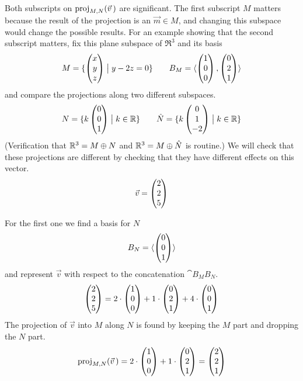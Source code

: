 \begin{example}  \label{ex:ProjIntoMAlongNGener}
Both subscripts on $\proj{\vec{v}\,}{M,N}$ are significant.
The first subscript $M$ matters because the result of
the projection is an $\vec{m}\in M$, and changing this subspace would
change the possible results.
For an example showing that the second subscript matters,  
fix this plane subspace of $\Re^3$ and its basis 
\begin{equation*}
  M=\set{\colvec{x \\ y \\ z}\suchthat y-2z=0}
  \qquad
  B_M=\sequence{
                \colvec{1 \\ 0 \\ 0},
                \colvec{0 \\ 2 \\ 1} }
\end{equation*}
and compare the projections along two different subspaces. 
\begin{equation*}
  N=\set{k\colvec{0 \\ 0 \\ 1}\suchthat k\in\Re}
  \qquad
  \hat{N}=\set{k\colvec{0 \\ 1 \\ -2}\suchthat k\in\Re}
\end{equation*}
(Verification that \( \Re^3=M\directsum N \) and 
\( \Re^3=M\directsum \hat{N} \) is routine.)
We will check that these projections are different by checking that
they have different effects on this vector.
\begin{equation*}
  \vec{v}=\colvec{2 \\ 2 \\ 5}
\end{equation*}

For the first one we find a basis for $N$
\begin{equation*}
  B_N=\sequence{
                \colvec{0 \\ 0 \\ 1} }
\end{equation*}
and represent $\vec{v}$ with respect to the concatenation $\cat{B_M}{B_N}$. 
\begin{equation*}
  \colvec{2 \\ 2 \\ 5}=
  2\cdot\colvec{1 \\ 0 \\ 0}+
  1\cdot\colvec{0 \\ 2 \\ 1}+
  4\cdot\colvec{0 \\ 0 \\ 1}
\end{equation*}
The projection of $\vec{v}$ into $M$ along $N$ is found by
keeping the $M$ part and dropping the $N$ part. 
\begin{equation*}
  \proj{\vec{v}\,}{M,N}
  =2\cdot\colvec{1 \\ 0 \\ 0}+
  1\cdot\colvec{0 \\ 2 \\ 1}
  =\colvec{2 \\ 2 \\ 1}
\end{equation*}


\end{example}
